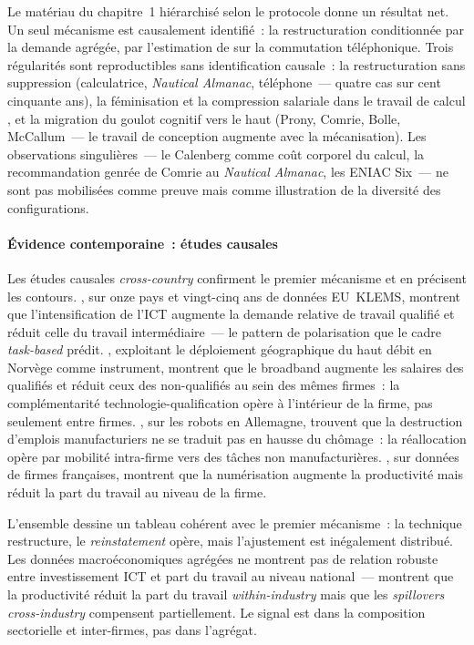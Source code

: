 Le matériau du chapitre~1 hiérarchisé selon le protocole donne un résultat net. Un seul mécanisme est causalement identifié~: la restructuration conditionnée par la demande agrégée, par l'estimation de \textcite{feigenbaum_answering_2024} sur la commutation téléphonique. Trois régularités sont reproductibles sans identification causale~: la restructuration sans suppression (calculatrice, \emph{Nautical Almanac}, téléphone~--- quatre cas sur cent cinquante ans), la féminisation et la compression salariale dans le travail de calcul \parencite{davies_womans_1982,strom_tipping_1992,daston_calculation_2018}, et la migration du goulot cognitif vers le haut (Prony, Comrie, Bolle, McCallum~--- le travail de conception augmente avec la mécanisation). Les observations singulières~--- le Calenberg comme coût corporel du calcul, la recommandation genrée de Comrie au \emph{Nautical Almanac}, les ENIAC Six~--- ne sont pas mobilisées comme preuve mais comme illustration de la diversité des configurations.

\paragraph{Évidence contemporaine~: études causales}

Les études causales \emph{cross-country} confirment le premier mécanisme et en précisent les contours. \textcite{michaels_has_2014}, sur onze pays et vingt-cinq ans de données EU~KLEMS, montrent que l'intensification de l'ICT augmente la demande relative de travail qualifié et réduit celle du travail intermédiaire~--- le pattern de polarisation que le cadre \emph{task-based} prédit. \textcite{akerman_skill_2015}, exploitant le déploiement géographique du haut débit en Norvège comme instrument, montrent que le broadband augmente les salaires des qualifiés et réduit ceux des non-qualifiés au sein des mêmes firmes~: la complémentarité technologie-qualification opère à l'intérieur de la firme, pas seulement entre firmes. \textcite{dauth_adjusting_2021}, sur les robots en Allemagne, trouvent que la destruction d'emplois manufacturiers ne se traduit pas en hausse du chômage~: la réallocation opère par mobilité intra-firme vers des tâches non manufacturières. \textcite{cette_icl_2021}, sur données de firmes françaises, montrent que la numérisation augmente la productivité mais réduit la part du travail au niveau de la firme.

L'ensemble dessine un tableau cohérent avec le premier mécanisme~: la technique restructure, le \emph{reinstatement} opère, mais l'ajustement est inégalement distribué. Les données macroéconomiques agrégées ne montrent pas de relation robuste entre investissement ICT et part du travail au niveau national~--- \textcite{autor_salomons_2018} montrent que la productivité réduit la part du travail \emph{within-industry} mais que les \emph{spillovers cross-industry} compensent partiellement. Le signal est dans la composition sectorielle et inter-firmes, pas dans l'agr\'egat.

